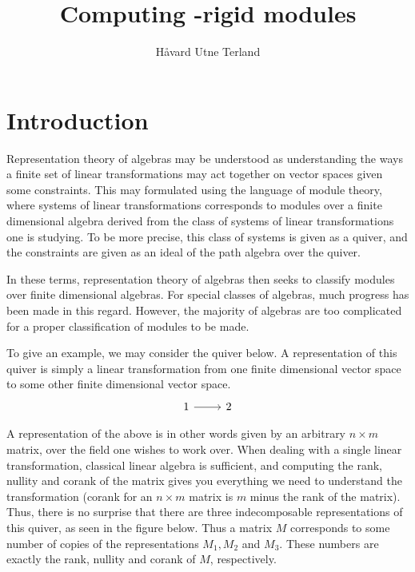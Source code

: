 \documentclass[]{article}
\title{Computing \tu-rigid modules}
\author{Håvard Utne Terland}
\theoremstyle{definition}
\begin{document}
\maketitle

\begin{abstract}

\end{abstract}

\section{Introduction}
Representation theory of algebras may be understood as understanding the ways a finite set of linear transformations may act together on vector spaces given some constraints. This may formulated using the language of module theory, where systems of linear transformations corresponds to modules over a finite dimensional algebra derived from the class of systems of linear transformations one is studying. To be more precise, this class of systems is given as a quiver, and the constraints are given as an ideal of the path algebra over the quiver.


In these terms, representation theory of algebras then seeks to classify modules over finite dimensional algebras. For special classes of algebras, much progress has been made in this regard. However, the majority of algebras are too complicated for a proper classification of modules to be made.

To give an example, we may consider the quiver below. A representation of this quiver is simply a linear transformation from one finite dimensional vector space to some other finite dimensional vector space.
\[\begin{tikzcd}
	1 & 2
	\arrow[from=1-1, to=1-2]
\end{tikzcd}\]

A representation of the above is in other words given by an arbitrary $n \times m$ matrix, over the field one wishes to work over. When dealing with a single linear transformation, classical linear algebra is sufficient, and computing the rank, nullity and corank of the matrix gives you everything we need to understand the transformation (corank for an $n \times m$ matrix is $m$ minus the rank of the matrix). Thus, there is no surprise that there are three indecomposable representations of this quiver, as seen in the figure below. Thus a matrix $M$ corresponds to some number of copies of the representations $M_1,M_2$ and $M_3$. These numbers are exactly the rank, nullity and corank of $M$, respectively.
\end{document}
